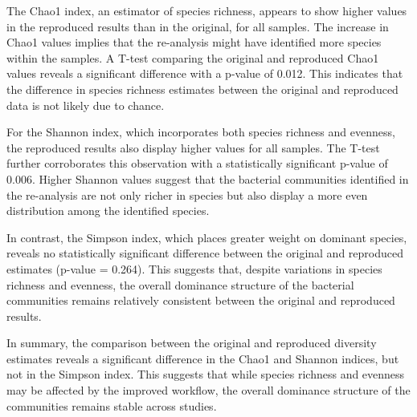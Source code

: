 The Chao1 index, an estimator of species richness, appears to show higher values in the reproduced results than in the original, for all samples. The increase in Chao1 values implies that the re-analysis might have identified more species within the samples. A T-test comparing the original and reproduced Chao1 values reveals a significant difference with a p-value of 0.012. This indicates that the difference in species richness estimates between the original and reproduced data is not likely due to chance.

For the Shannon index, which incorporates both species richness and evenness, the reproduced results also display higher values for all samples. The T-test further corroborates this observation with a statistically significant p-value of 0.006. Higher Shannon values suggest that the bacterial communities identified in the re-analysis are not only richer in species but also display a more even distribution among the identified species.

In contrast, the Simpson index, which places greater weight on dominant species, reveals no statistically significant difference between the original and reproduced estimates (p-value = 0.264). This suggests that, despite variations in species richness and evenness, the overall dominance structure of the bacterial communities remains relatively consistent between the original and reproduced results.

In summary, the comparison between the original and reproduced diversity estimates reveals a significant difference in the Chao1 and Shannon indices, but not in the Simpson index. This suggests that while species richness and evenness may be affected by the improved workflow, the overall dominance structure of the communities remains stable across studies.




